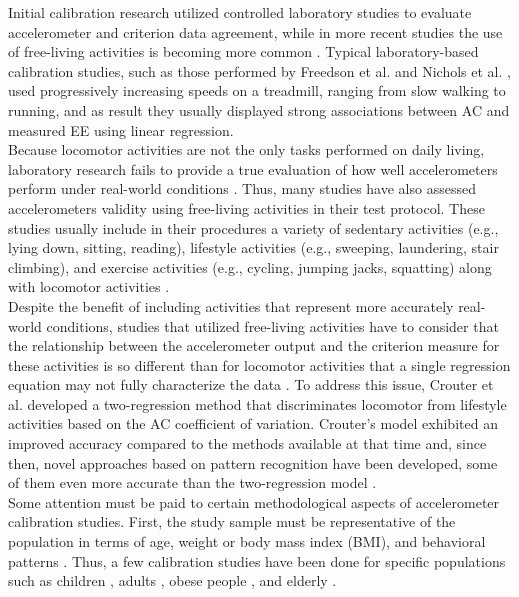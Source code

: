 \documentclass[11pt]{article}
\begin{document}
Initial calibration research utilized controlled laboratory studies to evaluate accelerometer and criterion data agreement, while in more recent studies the use of free-living activities is becoming more common \cite{Welk_2005, Matthews_2005}. Typical laboratory-based calibration studies, such as those performed by Freedson et al. \citeyear{Freedson_1998} and Nichols et al. \citeyear{Nichols_1999}, used progressively increasing speeds on a treadmill, ranging from slow walking to running, and as result they usually displayed strong associations between AC and measured EE using linear regression. \\

Because locomotor activities are not the only tasks performed on daily living, laboratory research fails to provide a true evaluation of how well accelerometers perform under real-world conditions \cite{Welk_2005}. Thus, many studies have also assessed accelerometers validity using free-living activities in their test protocol. These studies usually include in their procedures a variety of sedentary activities (e.g., lying down, sitting, reading), lifestyle activities (e.g., sweeping, laundering, stair climbing), and exercise activities (e.g., cycling, jumping jacks, squatting) along with locomotor activities \cite{Montoye_2015, Montoye_2016b}. \\

Despite the benefit of including activities that represent more accurately real-world conditions, studies that utilized free-living activities have to consider that the relationship between the accelerometer output and the criterion measure for these activities is so different than for locomotor activities that a single regression equation may not fully characterize the data \cite{Welk_2005}. To address this issue, Crouter et al. \citeyear{Crouter_2006} developed a two-regression method that discriminates locomotor from lifestyle activities based on the AC coefficient of variation. Crouter's model exhibited an improved accuracy compared to the methods available at that time and, since then, novel approaches based on pattern recognition have been developed, some of them even more accurate than the two-regression model \cite{Farrahi_2019, Basset_2012}. \\

Some attention must be paid to certain methodological aspects of accelerometer calibration studies. First, the study sample must be representative of the population in terms of age, weight or body mass index (BMI), and behavioral patterns \cite{Welk_2005, Strath_2012}. Thus, a few calibration studies have been done for specific populations such as children \cite{Phillips_2013, McMurray_2016}, adults \cite{Freedson_1998, Hibbing_2018}, obese people \cite{Aadland_2012}, and elderly \cite{Evenson_2015}. \\
\end{document}
